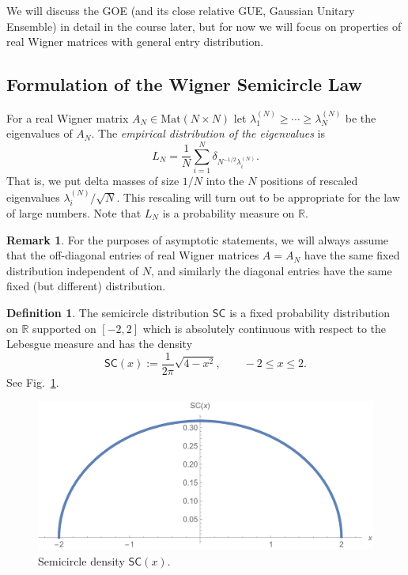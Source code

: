 \documentclass[letterpaper,11pt,oneside,reqno]{amsart}
\numberwithin{equation}{section}
\newcommand{\SC}{\mathsf{SC}}
\theoremstyle{definition}
\newtheorem{definition}[proposition]{Definition}
\newtheorem{remark}[proposition]{Remark}
\begin{document}
We will discuss the GOE (and its close relative GUE, Gaussian Unitary Ensemble)
in detail in the course later, but for now we will focus on 
properties of real Wigner matrices with general entry distribution.


\subsection{Formulation of the Wigner Semicircle Law} %
\label{sub:formulation_of_the_wigner_semicircle_law}

For a real Wigner matrix $A_N\in\mathrm{Mat}(N\times N)$ let
$\lambda_1^{(N)}\geq \cdots \geq \lambda_N^{(N)}$ be the eigenvalues of $A_N$.
The \emph{empirical distribution of the eigenvalues} is
\begin{equation}\label{EmpericalDistributionOfEigenvalues}
	L_N=\frac{1}{N}\sum_{i=1}^N \delta_{N^{-1/2}\lambda_{i}^{(N)}}.
\end{equation}
That is, we put delta masses of size $1/N$ into the
$N$ positions of rescaled eigenvalues 
$\lambda_{i}^{(N)}/\sqrt N$. This rescaling will turn out to be appropriate for the 
law of large numbers.
Note that $L_N$ is a probability measure on $\mathbb{R}$.

\begin{remark}
	For the purposes of asymptotic statements, we will always assume that the 
	off-diagonal entries of real Wigner matrices 
	$A=A_N$ have the same fixed distribution independent of $N$,
	and similarly the diagonal entries 
	have the same fixed (but different) distribution.
\end{remark}

\begin{definition}
	The semicircle distribution $\SC$ is 
	a fixed probability distribution on $\mathbb{R}$
	supported on $[-2,2]$
	which is absolutely continuous with respect to the
	Lebesgue measure and has the density
	\begin{equation}\label{SemicircleDistribution}
		\SC(x):=\frac{1}{2\pi}\sqrt{4-x^2}, \qquad -2\leq x\leq 2.
	\end{equation}
	See Fig.~\ref{fig:semicircle}.
\end{definition}

\begin{figure}[htbp]
	\includegraphics[width=.5\textwidth]{img/SC.pdf}
	\caption{Semicircle density $\SC(x)$.}
	\label{fig:semicircle}
\end{figure}
\end{document}
